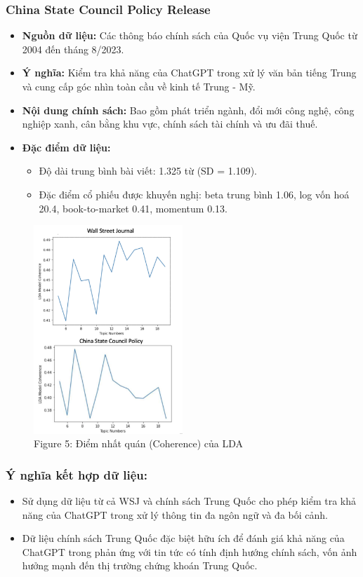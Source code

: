 \documentclass[a4paper,12pt]{article}
\begin{document}
\subsubsection{China State Council Policy Release}
\begin{itemize}
    \item \textbf{Nguồn dữ liệu:} Các thông báo chính sách của Quốc vụ viện Trung Quốc từ 2004 đến tháng 8/2023.
    \item \textbf{Ý nghĩa:} Kiểm tra khả năng của ChatGPT trong xử lý văn bản tiếng Trung và cung cấp góc nhìn toàn cầu về kinh tế Trung - Mỹ.
    \item \textbf{Nội dung chính sách:} Bao gồm phát triển ngành, đổi mới công nghệ, công nghiệp xanh, cân bằng khu vực, chính sách tài chính và ưu đãi thuế.
    \item \textbf{Đặc điểm dữ liệu:}
    \begin{itemize}
        \item Độ dài trung bình bài viết: 1.325 từ (SD = 1.109).
        \item Đặc điểm cổ phiếu được khuyến nghị: beta trung bình 1.06, log vốn hoá 20.4, book-to-market 0.41, momentum 0.13.
    \end{itemize}
\end{itemize}

\begin{figure}[H]
    \centering
    \includegraphics[width=0.5\textwidth]{fig/fig5.png}
    \caption{Figure 5: Điểm nhất quán (Coherence) của LDA}
\end{figure}

\noindent
\subsubsection{{Ý nghĩa kết hợp dữ liệu:}}
\begin{itemize}
    \item Sử dụng dữ liệu từ cả WSJ và chính sách Trung Quốc cho phép kiểm tra khả năng của ChatGPT trong xử lý thông tin đa ngôn ngữ và đa bối cảnh.
    \item Dữ liệu chính sách Trung Quốc đặc biệt hữu ích để đánh giá khả năng của ChatGPT trong phản ứng với tin tức có tính định hướng chính sách, vốn ảnh hưởng mạnh đến thị trường chứng khoán Trung Quốc.
\end{itemize}
\end{document}

